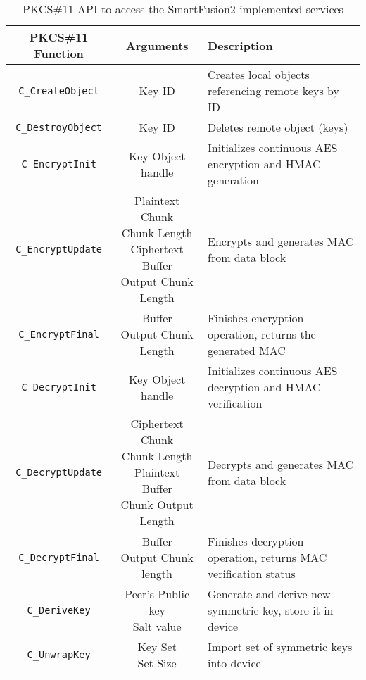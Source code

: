 \begin{table}[]
\centering
\def\arraystretch{1.5}
	\begin{tabular}{|c|c|l|}
	\hline
	\textbf{PKCS\#11 Function} & \textbf{Arguments} & \textbf{Description} \\ \hline
	\texttt{C\_CreateObject}	& Key ID & Creates local objects referencing remote keys by ID \\ \hline
	\texttt{C\_DestroyObject}	& Key ID & Deletes remote object (keys)\\ \hline
	\texttt{C\_EncryptInit}		& Key Object handle & Initializes continuous AES encryption and HMAC generation \\ \hline
	\texttt{C\_EncryptUpdate}	& \makecell{Plaintext Chunk\\Chunk Length\\Ciphertext Buffer\\Output Chunk Length} & Encrypts and generates MAC from data block \\ \hline
	\texttt{C\_EncryptFinal}	& \makecell{Buffer\\Output Chunk Length} & Finishes encryption operation, returns the generated MAC\\ \hline
	\texttt{C\_DecryptInit}		& Key Object handle & Initializes continuous AES decryption and HMAC verification\\ \hline
	\texttt{C\_DecryptUpdate}	& \makecell{Ciphertext Chunk\\Chunk Length\\Plaintext Buffer\\Chunk Output Length} & Decrypts and generates MAC from data block\\ \hline
	\texttt{C\_DecryptFinal}	& \makecell{Buffer\\Output Chunk length} & Finishes decryption operation, returns MAC verification status\\ \hline
	\texttt{C\_DeriveKey}		& \makecell{Peer's Public key\\Salt value} & Generate and derive new symmetric key, store it in device \\ \hline
	\texttt{C\_UnwrapKey}		& \makecell{Key Set\\Set Size} & Import set of symmetric keys into device\\ \hline
\end{tabular}
\caption{PKCS\#11 API to access the SmartFusion2 implemented services}
\label{tab:pkcs11-api}
\end{table}
